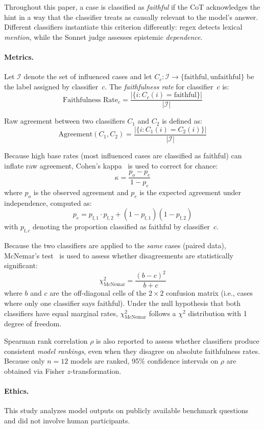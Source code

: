 Throughout this paper, a case is classified as \emph{faithful} if the CoT acknowledges the hint in a way that the classifier treats as causally relevant to the model's answer. Different classifiers instantiate this criterion differently: regex detects lexical \emph{mention}, while the Sonnet judge assesses epistemic \emph{dependence}.

\paragraph{Metrics.} Let $\mathcal{I}$ denote the set of influenced cases and let $C_c \colon \mathcal{I} \to \{\text{faithful}, \text{unfaithful}\}$ be the label assigned by classifier~$c$. The \emph{faithfulness rate} for classifier~$c$ is:
\begin{equation}
\text{Faithfulness Rate}_c = \frac{|\{i : C_c(i) = \text{faithful}\}|}{|\mathcal{I}|}
\end{equation}

Raw agreement between two classifiers $C_1$ and $C_2$ is defined as:
\begin{equation}
\text{Agreement}(C_1, C_2) = \frac{|\{i : C_1(i) = C_2(i)\}|}{|\mathcal{I}|}
\end{equation}

Because high base rates (most influenced cases are classified as faithful) can inflate raw agreement, Cohen's kappa~\cite{cohen1960coefficient} is used to correct for chance:
\begin{equation}
\kappa = \frac{p_o - p_e}{1 - p_e}
\end{equation}
where $p_o$ is the observed agreement and $p_e$ is the expected agreement under independence, computed as:
\begin{equation}
p_e = p_{\text{f},1} \cdot p_{\text{f},2} + (1 - p_{\text{f},1})(1 - p_{\text{f},2})
\end{equation}
with $p_{\text{f},c}$ denoting the proportion classified as faithful by classifier~$c$.

Because the two classifiers are applied to the \emph{same} cases (paired data), McNemar's test~\cite{mcnemar1947note} is used to assess whether disagreements are statistically significant:
\begin{equation}
\chi^2_{\text{McNemar}} = \frac{(b - c)^2}{b + c}
\end{equation}
where $b$ and $c$ are the off-diagonal cells of the $2 \times 2$ confusion matrix (i.e., cases where only one classifier says faithful). Under the null hypothesis that both classifiers have equal marginal rates, $\chi^2_{\text{McNemar}}$ follows a $\chi^2$ distribution with 1 degree of freedom.

Spearman rank correlation $\rho$ is also reported to assess whether classifiers produce consistent \emph{model rankings}, even when they disagree on absolute faithfulness rates. Because only $n = 12$ models are ranked, 95\% confidence intervals on $\rho$ are obtained via Fisher $z$-transformation.

\paragraph{Ethics.} This study analyzes model outputs on publicly available benchmark questions and did not involve human participants.

